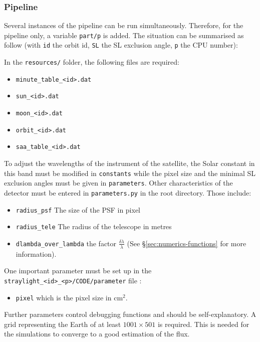 \documentclass[a4paper,10pt]{article}
\begin{document}
\subsubsection{Pipeline}
Several instances of the pipeline can be run simultaneously. Therefore, for the pipeline only, a variable \verb=part/p= is added. 
The situation can be summarised as follow (with \verb=id= the orbit id, \verb=SL= the SL exclusion angle, \verb=p= the CPU number):


In the \verb=resources/= folder, the following files are required:
\begin{itemize}
 \item \verb=minute_table_<id>.dat=
  \item \verb=sun_<id>.dat=
  \item \verb=moon_<id>.dat=
  \item \verb=orbit_<id>.dat=
  \item \verb=saa_table_<id>.dat=
\end{itemize}
To adjust the wavelengths of the instrument of the satellite, the Solar constant in this band must be modified in \verb=constants= while the pixel size and the minimal SL exclusion angles must be given in \verb=parameters=. Other characteristics of the detector must be entered in \verb=parameters.py= in the root directory. Those include:
\begin{itemize}
 \item \verb=radius_psf= The size of the PSF in pixel
 \item \verb=radius_tele= The radius of the telescope in metres
 \item \verb=dlambda_over_lambda= the factor $\frac{\delta\lambda}{\lambda}$ (See \S\ref{sec:numerics-functions} for more information).
\end{itemize}
One important parameter must be set up in the \verb=straylight_<id>_<p>/CODE/parameter= file :
\begin{itemize}
 \item \verb=pixel= which is the pixel size in cm$^2$.
\end{itemize}
Further parameters control debugging functions and should be self-explanatory. A grid representing the Earth of at least $1001\times 501$ is required. This is needed for the simulations to converge to a good estimation of the flux. 
\end{document}
